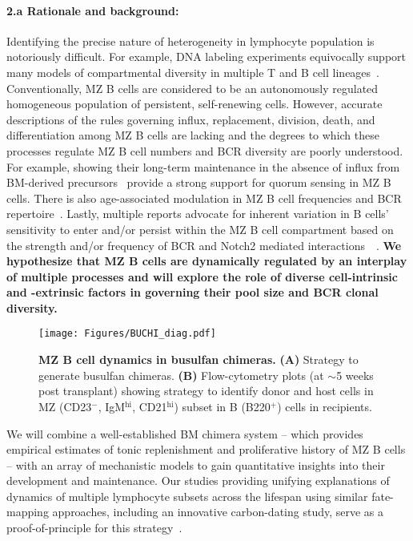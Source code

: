\documentclass[11pt]{article}
\newcommand{\para}[1]{\vspace*{-4.5mm}\paragraph{#1}}
\newcommand{\red}[1]{{\color{red}{#1}}}
\begin{document}
\para{{2.a Rationale and background:}}
Identifying the precise nature of heterogeneity in lymphocyte population is notoriously difficult. For example, DNA labeling experiments equivocally support many models of compartmental diversity in multiple  T and B cell lineages~\red{(CITEs)}.
Conventionally, MZ B cells are considered to be an autonomously regulated homogeneous population of persistent, self-renewing cells. 
However, accurate descriptions of the rules governing influx, replacement, division, death, and differentiation among MZ B cells are lacking and the degrees to which these processes regulate MZ B cell numbers and BCR diversity are poorly understood. 
For example,  showing their long-term maintenance in the absence of influx from BM-derived precursors~\cite{Carvalho_2001, Hao_2001} provide a strong support for quorum sensing in MZ B cells.   
There is also age-associated modulation in MZ B cell frequencies and BCR repertoire~\cite{Birjandi_2011, Cortegano_2017}.
Lastly, multiple reports advocate for inherent variation in B cells' sensitivity to enter and/or persist within the MZ B cell compartment based on the strength and/or frequency of BCR and Notch2 mediated interactions~~\red{(CITEs)}. %
\textbf{We hypothesize that MZ B cells are dynamically regulated by an interplay of multiple processes and will explore the role of diverse cell-intrinsic and -extrinsic factors in governing their pool size and BCR clonal diversity.
}

\begin{wrapfigure}{r}{0.4\textwidth}
\centering
\vspace*{-6mm}
\texttt{[image: Figures/BUCHI\_diag.pdf]}
\vspace*{-7mm}
\caption{\textbf{MZ B cell dynamics in busulfan chimeras.}
\textbf{(A)} Strategy to generate busulfan chimeras.
\textbf{(B)} Flow-cytometry plots (at $\sim$5 weeks post transplant) showing strategy to identify donor and host cells in MZ (CD23$^-$, IgM$^\text{hi}$, CD21$^\text{hi}$) subset in B (B220$^+$) cells in recipients.%
}
\label{fig:BUCHI}
\vspace*{-6mm}
\end{wrapfigure}
We will combine a well-established BM chimera system -- which provides empirical estimates of tonic replenishment and proliferative history of MZ B cells -- with an array of mechanistic models to gain quantitative insights into their development and maintenance.
Our studies providing unifying explanations of dynamics of multiple lymphocyte subsets across the lifespan using similar fate-mapping approaches, including an innovative carbon-dating study, serve as a proof-of-principle for this strategy~\cite{Rane_2018, Verheijen_2020, Rane_2022, Mold_2019}.
\end{document}
